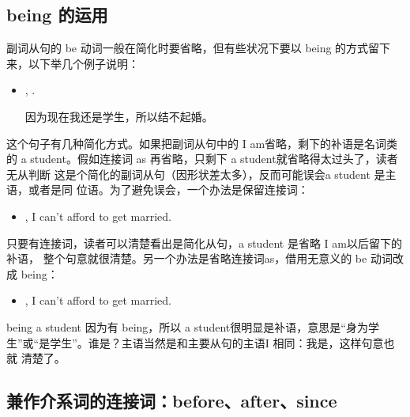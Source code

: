 \subsection{being 的运用}

副词从句的 be 动词一般在简化时要省略，但有些状况下要以 being
的方式留下来，以下举几个例子说明：
\begin{itemize}
\item {},  
  .

因为现在我还是学生，所以结不起婚。
\end{itemize}

这个句子有几种简化方式。如果把副词从句中的 I am省略，剩下的补语是名词类的 a
student。假如连接词 as 再省略，只剩下 a student就省略得太过头了，读者无从判断
这是个简化的副词从句（因形状差太多），反而可能误会a student 是主语，或者是同
位语。为了避免误会，一个办法是保留连接词：
\begin{itemize}
\item {}, I can't afford to get married.
\end{itemize}
只要有连接词，读者可以清楚看出是简化从句，a student 是省略 I am以后留下的补语，
整个句意就很清楚。另一个办法是省略连接词as，借用无意义的 be 动词改成 being：
\begin{itemize}
\item {}, I can't afford to get married.
\end{itemize}
being a student 因为有 being，所以 a student很明显是补语，意思是“身为学
生”或“是学生”。谁是？主语当然是和主要从句的主语I 相同：我是，这样句意也就
清楚了。

\subsection{兼作介系词的连接词：before、after、since}

